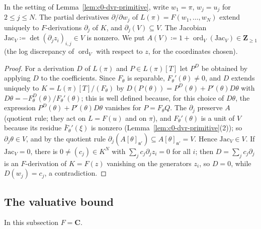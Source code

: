 \begin{lemma}\label{lem:c0-dvr-jacobian}
\leanok
{}
In the setting of Lemma~\ref{lem:c0-dvr-primitive}, write $w_1=\pi$, $w_j=u_j$ for $2\le j\le N$. The partial derivatives
$\partial/\partial w_j$ of $L(\pi)=F(w_1,\dots,w_N)$ extend uniquely to $F$-derivations $\partial_j$ of $K$, and $\partial_j(V)\subseteq V$.
The Jacobian $\mathrm{Jac}_V\coloneqq\det(\partial_jz_i)_{i,j}\in V$ is nonzero. We put
$A(V)\coloneqq1+\operatorname{ord}_V(\mathrm{Jac}_V)\in\mathbf Z_{\ge1}$ (the log discrepancy of $\operatorname{ord}_V$ with respect to $z$, for the coordinates chosen).
\end{lemma}

\begin{proof}
For a derivation $D$ of $L(\pi)$ and $P\in L(\pi)[T]$ let $P^D$ be obtained by applying $D$ to the coefficients. Since $F_\theta$ is
separable, $F_\theta'(\theta)\ne0$, and $D$ extends uniquely to $K=L(\pi)[T]/(F_\theta)$ by $D(P(\theta))=P^D(\theta)+P'(\theta)D\theta$ with
$D\theta=-F_\theta^D(\theta)/F_\theta'(\theta)$; this is well defined because, for this choice of $D\theta$, the expression
$P^D(\theta)+P'(\theta)D\theta$ vanishes for $P=F_\theta Q$. The $\partial_j$ preserve $A$ (quotient rule; they act on $L=F(u)$ and on $\pi$), and $F_\theta'(\theta)$ is a unit of $V$ because its
residue $\bar F_\theta'(\xi)$ is nonzero (Lemma~\ref{lem:c0-dvr-primitive}(2)); so $\partial_j\theta\in V$, and by the quotient rule
$\partial_j(A[\theta]_{\mathfrak n'})\subseteq A[\theta]_{\mathfrak n'}=V$. Hence $\mathrm{Jac}_V\in V$. If $\mathrm{Jac}_V=0$, there is $0\ne(c_j)\in K^N$ with
$\sum_jc_j\partial_jz_i=0$ for all $i$; then $D=\sum_jc_j\partial_j$ is an $F$-derivation of $K=F(z)$ vanishing on the generators $z_i$, so
$D=0$, while $D(w_j)=c_j$, a contradiction.
\end{proof}

\subsection{The valuative bound}

In this subsection $F=\mathbf C$.

